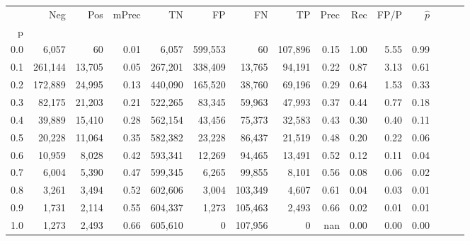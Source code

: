 \begin{tabular}{rrrrrrrrrrrrrrr}
\toprule
{} &      Neg &     Pos & mPrec &       TN &       FP &       FN &       TP &  Prec &   Rec &  FP/P & $\hat{p}$ \\
p   &          &         &       &          &          &          &          &       &       &       &           \\
\midrule
0.0 &    6,057 &      60 &  0.01 &    6,057 &  599,553 &       60 &  107,896 &  0.15 &  1.00 &  5.55 &      0.99 \\
0.1 &  261,144 &  13,705 &  0.05 &  267,201 &  338,409 &   13,765 &   94,191 &  0.22 &  0.87 &  3.13 &      0.61 \\
0.2 &  172,889 &  24,995 &  0.13 &  440,090 &  165,520 &   38,760 &   69,196 &  0.29 &  0.64 &  1.53 &      0.33 \\
0.3 &   82,175 &  21,203 &  0.21 &  522,265 &   83,345 &   59,963 &   47,993 &  0.37 &  0.44 &  0.77 &      0.18 \\
0.4 &   39,889 &  15,410 &  0.28 &  562,154 &   43,456 &   75,373 &   32,583 &  0.43 &  0.30 &  0.40 &      0.11 \\
0.5 &   20,228 &  11,064 &  0.35 &  582,382 &   23,228 &   86,437 &   21,519 &  0.48 &  0.20 &  0.22 &      0.06 \\
0.6 &   10,959 &   8,028 &  0.42 &  593,341 &   12,269 &   94,465 &   13,491 &  0.52 &  0.12 &  0.11 &      0.04 \\
0.7 &    6,004 &   5,390 &  0.47 &  599,345 &    6,265 &   99,855 &    8,101 &  0.56 &  0.08 &  0.06 &      0.02 \\
0.8 &    3,261 &   3,494 &  0.52 &  602,606 &    3,004 &  103,349 &    4,607 &  0.61 &  0.04 &  0.03 &      0.01 \\
0.9 &    1,731 &   2,114 &  0.55 &  604,337 &    1,273 &  105,463 &    2,493 &  0.66 &  0.02 &  0.01 &      0.01 \\
1.0 &    1,273 &   2,493 &  0.66 &  605,610 &        0 &  107,956 &        0 &   nan &  0.00 &  0.00 &      0.00 \\
\bottomrule
\end{tabular}
